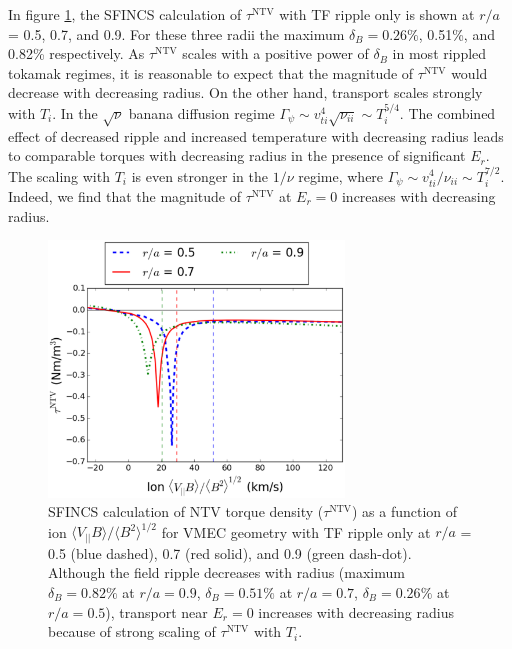 \documentclass[aip, pop, preprint]{revtex4-1}
\begin{document}
In figure \ref{fig:Torque_radiusscaling}, the SFINCS calculation of $\tau^{\mathrm{NTV}}$ with TF ripple only is shown at $r/a$ = 0.5, 0.7, and 0.9. For these three radii the maximum $\delta_B = 0.26\%$,  0.51\%, and 0.82\% respectively. As $\tau^{\mathrm{NTV}}$ scales with a positive power of $\delta_B$ in most rippled tokamak regimes, it is reasonable to expect that the magnitude of $\tau^{\mathrm{NTV}}$ would decrease with decreasing radius. On the other hand, transport scales strongly with $T_i$. In the $\sqrt{\nu}$ banana diffusion regime \cite{Shaing2008} $\Gamma_{\psi} \sim v_{ti}^4 \sqrt{\nu_{ii}} \sim T_i^{5/4}$. The combined effect of decreased ripple and increased temperature with decreasing radius leads to comparable torques with decreasing radius in the presence of significant $E_r$.  The scaling with $T_i$ is even stronger in the $1/\nu$ regime,\cite{Stringer1972, Shaing2003} where $\Gamma_{\psi} \sim v_{ti}^4/\nu_{ii} \sim T_i^{7/2}$. Indeed, we find that the magnitude of $\tau^{\mathrm{NTV}}$ at $E_r = 0$ increases with decreasing radius.
 
\begin{figure}[h!]
\centering
\includegraphics[width=0.7\textwidth]{figure9.eps}
\caption{\label{fig:Torque_radiusscaling} SFINCS calculation of NTV torque density ($\tau^{\mathrm{NTV}}$) as a function of ion $\langle V_{||} B \rangle/\langle B^2 \rangle^{1/2}$ for VMEC geometry with TF ripple only at $r/a$ = 0.5 (blue dashed), 0.7 (red solid), and 0.9 (green dash-dot). Although the field ripple decreases with radius (maximum $\delta_B = 0.82\%$ at $r/a = 0.9$, $\delta_B = 0.51\%$ at $r/a = 0.7$, $\delta_B = 0.26\%$ at $r/a = 0.5$), transport near $E_r = 0$ increases with decreasing radius because of strong scaling of $\tau^{\mathrm{NTV}}$ with $T_i$.\cite{Stringer1972,Shaing2003}}
\end{figure}
\end{document}
